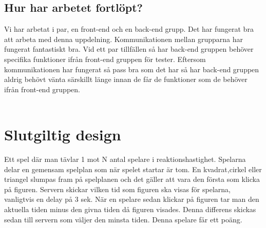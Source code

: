 \documentclass[a4paper]{article}
\begin{document}
\subsection{Hur har arbetet fortlöpt?}
Vi har arbetat i par, en front-end och en back-end grupp. Det har fungerat bra att arbeta med denna uppdelning. Kommunikationen mellan grupparna har fungerat fantastiskt bra. Vid ett par tillfällen så har back-end gruppen behöver specifika funktioner ifrån front-end gruppen för tester. Eftersom kommunikationen har fungerat så pass bra som det har så har back-end gruppen aldrig behövt vänta särskillt länge innan de får de funktioner som de behöver ifrån front-end gruppen. \\
\\

\section{Slutgiltig design}
Ett spel där man tävlar 1 mot N antal spelare i reaktionshastighet. Spelarna delar en gemensam spelplan som när spelet startar är tom. En kvadrat,cirkel eller triangel slumpas fram på spelplanen och det gäller att vara den första som klicka på figuren. Servern skickar vilken tid som figuren ska visas för spelarna, vanligtvis en delay på 3 sek. När en spelare sedan klickar på figuren tar man den aktuella tiden minus den givna tiden då figuren visades. Denna differens skickas sedan till servern som väljer den minsta tiden. Denna spelare får ett poäng.
\end{document}
